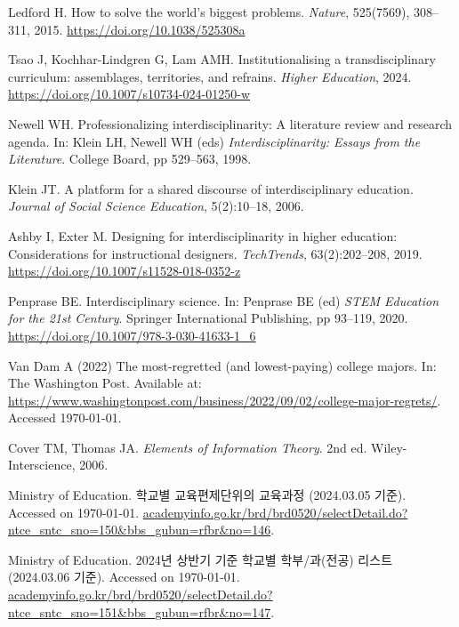 \documentclass{bmcart}
\begin{document}
\begin{thebibliography}{99}

Ledford H.
\newblock How to solve the world's biggest problems.
\newblock \emph{Nature}, 525(7569), 308--311, 2015.
\newblock \url{https://doi.org/10.1038/525308a}

Tsao J, Kochhar-Lindgren G, Lam AMH.
\newblock Institutionalising a transdisciplinary curriculum: assemblages, territories, and refrains.
\newblock \emph{Higher Education}, 2024.
\newblock \url{https://doi.org/10.1007/s10734-024-01250-w}

Newell WH.
\newblock Professionalizing interdisciplinarity: A literature review and research agenda.
\newblock In: Klein LH, Newell WH (eds) \emph{Interdisciplinarity: Essays from the Literature}. College Board, pp 529--563, 1998.

Klein JT.
\newblock A platform for a shared discourse of interdisciplinary education.
\newblock \emph{Journal of Social Science Education}, 5(2):10--18, 2006.

Ashby I, Exter M.
\newblock Designing for interdisciplinarity in higher education: Considerations for instructional designers.
\newblock \emph{TechTrends}, 63(2):202--208, 2019.
\newblock \url{https://doi.org/10.1007/s11528-018-0352-z}

Penprase BE.
\newblock Interdisciplinary science.
\newblock In: Penprase BE (ed) \emph{STEM Education for the 21st Century}. Springer International Publishing, pp 93--119, 2020.
\newblock \url{https://doi.org/10.1007/978-3-030-41633-1_6}

Van Dam A (2022) The most-regretted (and lowest-paying) college majors. In: The Washington Post. Available at: \url{https://www.washingtonpost.com/business/2022/09/02/college-major-regrets/}. \newline Accessed \today.

Cover TM, Thomas JA.
\newblock \emph{Elements of Information Theory}. 
\newblock 2nd ed. Wiley-Interscience, 2006.

Ministry of Education. 
\newblock 학교별 교육편제단위의 교육과정 (2024.03.05 기준). 
\newblock Accessed on \today. \url{academyinfo.go.kr/brd/brd0520/selectDetail.do?ntce_sntc_sno=150&bbs_gubun=rfbr&no=146}.

Ministry of Education. 
\newblock 2024년 상반기 기준 학교별 학부/과(전공) 리스트 (2024.03.06 기준). 
\newblock Accessed on \today. \url{academyinfo.go.kr/brd/brd0520/selectDetail.do?ntce_sntc_sno=151&bbs_gubun=rfbr&no=147}.


\end{thebibliography}
\end{document}
